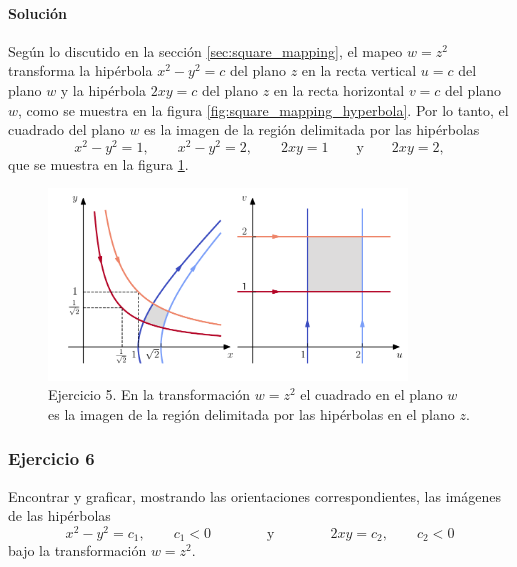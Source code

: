 \documentclass[a4paper]{report}
\begin{document}
\paragraph{Solución} Según lo discutido en la sección \ref{sec:square_mapping}, el mapeo \(w=z^2\) transforma la hipérbola \(x^2-y^2=c\) del plano \(z\) en la recta vertical \(u=c\) del plano \(w\) y la hipérbola \(2xy=c\) del plano \(z\) en la recta horizontal \(v=c\) del plano \(w\), como se muestra en la figura \ref{fig:square_mapping_hyperbola}. Por lo tanto, el cuadrado del plano \(w\) es la imagen de la región delimitada por las hipérbolas
\[
 x^2-y^2=1,\qquad x^2-y^2=2, \qquad 2xy=1\qquad\textrm{y}\qquad 2xy=2, 
\]
que se muestra en la figura \ref{fig:exercise_14_05}. 
\begin{figure}[!htb]
 \begin{center}
 \includegraphics[width=0.85\textwidth]{figuras/exercise_14_05.pdf}
 \caption{\label{fig:exercise_14_05} Ejercicio 5. En la transformación \(w=z^2\) el cuadrado en el plano \(w\) es la imagen de la región delimitada por las hipérbolas en el plano \(z\).}
 \end{center}
\end{figure}

\subsubsection{Ejercicio 6}

Encontrar y graficar, mostrando las orientaciones correspondientes, las imágenes de las hipérbolas 
\[
 x^2-y^2=c_1,\qquad c_1<0\qquad\qquad\textrm{y}\qquad\qquad 2xy=c_2,\qquad c_2<0
\]
bajo la transformación \(w=z^2\).
\end{document}
